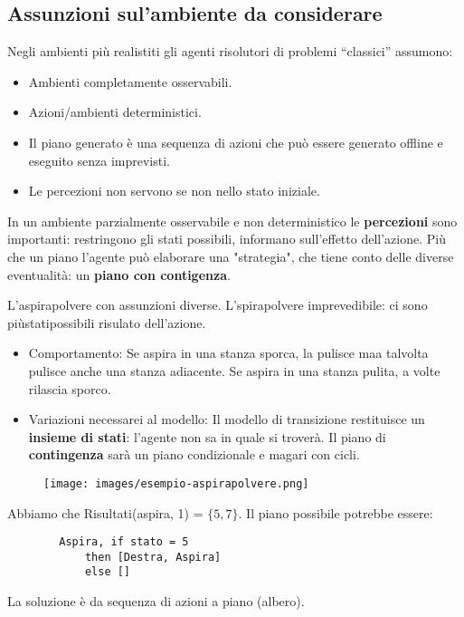 \subsection{Assunzioni sul'ambiente da considerare}
Negli ambienti più realistiti gli agenti risolutori di problemi “classici” assumono:
\begin{itemize}
    \item Ambienti completamente osservabili.
    \item Azioni/ambienti deterministici.
    \item Il piano generato è una sequenza di azioni che può essere generato offline e eseguito senza imprevisti.
    \item Le percezioni non servono se non nello stato iniziale.
\end{itemize}
In un ambiente parzialmente osservabile e non deterministico le \textbf{percezioni} sono importanti: restringono gli stati possibili, informano sull’effetto dell’azione.
Più che un piano l'agente può elaborare una "strategia", che tiene conto delle diverse eventualità: un \textbf{piano con contigenza}.
\begin{example}
    L'aspirapolvere con assunzioni diverse. L'spirapolvere imprevedibile: ci sono piùstatipossibili risulato dell'azione.
    \begin{itemize}
        \item Comportamento: Se aspira in una stanza sporca, la pulisce maa talvolta pulisce anche una stanza adiacente. Se aspira in una stanza pulita, a volte rilascia sporco.
        \item Variazioni necessarei al modello: Il modello di transizione restituisce un \textbf{insieme di stati}: l'agente non sa in quale si troverà. Il piano di \textbf{contingenza} sarà un piano condizionale e magari con cicli.
    \end{itemize}
    \begin{figure}[h!]
        \centering
        \texttt{[image: images/esempio-aspirapolvere.png]}
    \end{figure}

    \hspace{-15pt}Abbiamo che Risultati(aspira, 1) = $\{5, 7\}$. Il piano possibile potrebbe essere:
    \begin{lstlisting}
        Aspira, if stato = 5 
            then [Destra, Aspira]
            else []
    \end{lstlisting}
    La soluzione è da sequenza di azioni a piano (albero).
\end{example}
